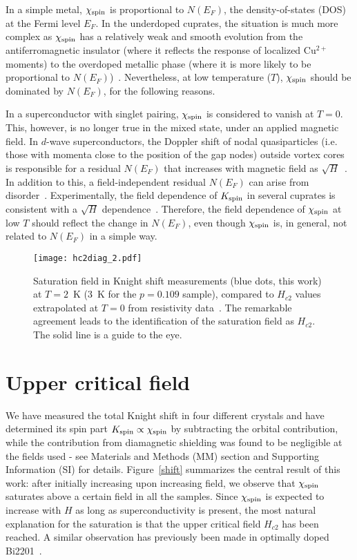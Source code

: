 \documentclass[superscriptaddress,twocolumn,prl,preprintnumbers,amsmath,amssymb]{revtex4}
\begin{document}
In a simple metal, $\chi_{\rm spin}$ is proportional to $N(E_F)$, the density-of-states (DOS) at the Fermi level $E_F$. In the underdoped cuprates, the situation is much more complex as $\chi_{\rm spin}$ has a relatively weak and smooth evolution from the antiferromagnetic insulator (where it reflects the response of localized Cu$^{2+}$ moments) to the overdoped metallic phase (where it is more likely to be proportional to $N(E_F)$)~\cite{Johnston89,Alloul89}. Nevertheless, at low temperature ($T$), $\chi_{\rm spin}$ should be dominated by $N(E_F)$, for the following reasons.

In a superconductor with singlet pairing, $\chi_{\rm spin}$ is considered to vanish at $T=0$. This, however, is no longer true in the mixed state, under an applied magnetic field. In $d$-wave superconductors, the Doppler shift of nodal quasiparticles (i.e. those with momenta close to the position of the gap nodes) outside vortex cores is responsible for a residual $N(E_F)$ that increases with magnetic field as $\sqrt{H}$~\cite{Volovik,Moler94,Hussey02}. In addition to this, a field-independent residual $N(E_F)$ can arise from disorder~\cite{Ishida91}. Experimentally, the field dependence of $K_{\rm spin}$ in several cuprates is consistent with a $\sqrt{H}$ dependence~\cite{Zheng99,Zheng02,Kawasaki10}. Therefore, the field dependence of $\chi_{\rm spin}$ at low $T$ should reflect the change in $N(E_F)$, even though $\chi_{\rm spin}$ is, in general, not related to $N(E_F)$ in a simple way.


\begin{figure}[b!]%
\centerline{\texttt{[image: hc2diag\_2.pdf]}} %
 \caption{Saturation field in Knight shift measurements (blue dots, this work) at $T=2$~K (3~K for the $p=0.109$ sample), compared to $H_{c2}$ values extrapolated at $T=0$ from resistivity data~\cite{Ramshaw12,Grissonnanche14}. The remarkable agreement leads to the identification of the saturation field as $H_{c2}$. The solid line is a guide to the eye.}
 \label{hc2diag}
\end{figure}


\section*{Upper critical field}

We have measured the total Knight shift in four different crystals and have determined its spin part $K_{\rm spin}\propto \chi_{\rm spin}$ by subtracting the orbital contribution, while the contribution from diamagnetic shielding was found to be negligible at the fields used - see Materials and Methods (MM) section and Supporting Information (SI) for details. Figure~\ref{shift} summarizes the central result of this work: after initially increasing upon increasing field, we observe that $\chi_{\rm spin}$ saturates above a certain field in all the samples. Since $\chi_{\rm spin}$ is expected to increase with $H$ as long as superconductivity is present, the most natural explanation for the saturation is that the upper critical field $H_{c2}$ has been reached. A similar observation has previously been made in optimally doped Bi2201~\cite{Mei12}.
\end{document}
